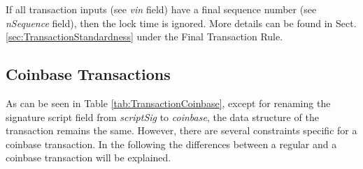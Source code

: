 \noindent
If all transaction inputs (see \textit{vin} field) have a final sequence number (see \mbox{\textit{nSequence}} field), then the lock time is ignored. More details can be found in Sect. \ref{sec:TransactionStandardness} under the Final Transaction Rule.


\clearpage
\subsection*{Coinbase Transactions} \label{sec:CoinbaseTransactions}
As can be seen in Table \ref{tab:TransactionCoinbase}, except for renaming the signature script field from \textit{scriptSig} to \textit{coinbase}, the data structure of the transaction remains the same. However, there are several constraints specific for a coinbase transaction. In the following the differences between a regular and a coinbase transaction will be explained.
